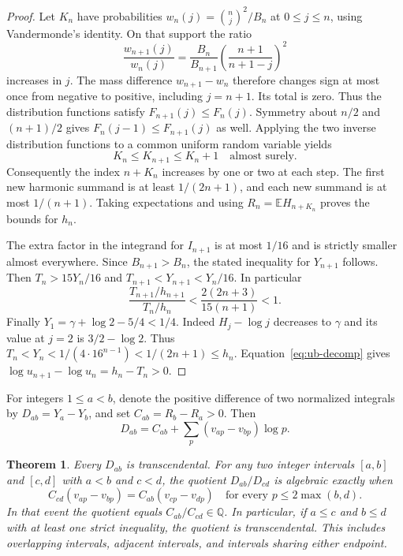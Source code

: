 \documentclass[11pt,a4paper]{article}
\newtheorem{theorem}{Theorem}[section]
\theoremstyle{definition}\newtheorem{definition}[theorem]{Definition}\newtheorem{example}[theorem]{Example}
\theoremstyle{remark}\newtheorem{remark}[theorem]{Remark}
\newcommand{\Q}{\mathbb Q}\newcommand{\Z}{\mathbb Z}\newcommand{\R}{\mathbb R}\newcommand{\N}{\mathbb N}
\begin{document}
\begin{proof}
Let $K_n$ have probabilities $w_n(j)=\binom nj^2/B_n$ at
$0\le j\le n$, using Vandermonde's identity. On that support the
ratio
\[
 \frac{w_{n+1}(j)}{w_n(j)}
   =\frac{B_n}{B_{n+1}}\left(\frac{n+1}{n+1-j}\right)^2
\]
increases in $j$. The mass difference $w_{n+1}-w_n$ therefore
changes sign at most once from negative to positive, including
$j=n+1$. Its total is zero. Thus the distribution functions satisfy
$F_{n+1}(j)\le F_n(j)$. Symmetry about $n/2$ and $(n+1)/2$ gives
$F_n(j-1)\le F_{n+1}(j)$ as well. Applying the two inverse
distribution functions to a common uniform random variable yields
\[
 K_n\le K_{n+1}\le K_n+1
 \quad\text{almost surely}.
\]
Consequently the index $n+K_n$ increases by one or two at each
step. The first new harmonic summand is at least $1/(2n+1)$,
and each new summand is at most $1/(n+1)$. Taking expectations and
using $R_n=\mathbb E H_{n+K_n}$ proves the bounds for $h_n$.

The extra factor in the integrand for $I_{n+1}$ is at most $1/16$
and is strictly smaller almost everywhere. Since $B_{n+1}>B_n$,
the stated inequality for $Y_{n+1}$ follows. Then
$T_n>15Y_n/16$ and $T_{n+1}<Y_{n+1}<Y_n/16$. In particular
\[
 \frac{T_{n+1}/h_{n+1}}{T_n/h_n}
  <\frac{2(2n+3)}{15(n+1)}<1.
\]
Finally $Y_1=\gamma+\log2-5/4<1/4$. Indeed
$H_j-\log j$ decreases to $\gamma$ and its value at $j=2$ is
$3/2-\log2$. Thus
$T_n<Y_n<1/(4\cdot16^{n-1})<1/(2n+1)\le h_n$.
Equation~\eqref{eq:ub-decomp} gives
$\log u_{n+1}-\log u_n=h_n-T_n>0$.
\end{proof}

For integers $1\le a<b$, denote the positive difference of two
normalized integrals by $D_{ab}=Y_a-Y_b$, and set
$C_{ab}=R_b-R_a>0$. Then
\begin{equation}
 D_{ab}=C_{ab}+\sum_p(v_{ap}-v_{bp})\log p .
 \label{eq:ub-chord}
\end{equation}

\begin{theorem}
\label{thm:ub-chords}
Every $D_{ab}$ is transcendental. For any two integer intervals
$[a,b]$ and $[c,d]$ with $a<b$ and $c<d$, the quotient $D_{ab}/D_{cd}$ is
algebraic exactly when
\begin{equation}
 C_{cd}(v_{ap}-v_{bp})=C_{ab}(v_{cp}-v_{dp})
 \quad\text{for every }p\le 2\max(b,d).
 \label{eq:ub-criterion}
\end{equation}
In that event the quotient equals $C_{ab}/C_{cd}\in\Q$. In
particular, if $a\le c$ and $b\le d$ with at least one strict
inequality, the quotient is transcendental. This includes overlapping
intervals, adjacent intervals, and intervals sharing either endpoint.
\end{theorem}
\end{document}
